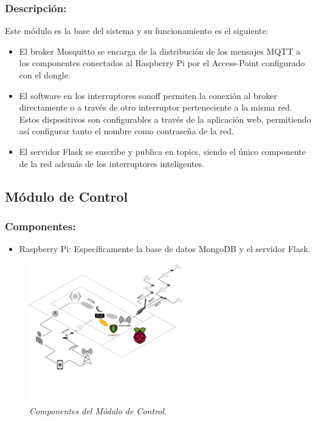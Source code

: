 \subsubsection{Descripción:}

Este módulo es la base del sistema y su funcionamiento es el siguiente:

\begin{itemize}

\item El broker Mosquitto se encarga de la distribución de los mensajes MQTT a los componentes conectados al Raspberry Pi por el Access-Point configurado con el dongle.

\item El software en los interruptores sonoff permiten la conexión al broker directamente o a través de otro interruptor perteneciente a la misma red. Estos dispositivos son configurables a través de la aplicación web, permitiendo así configurar tanto el nombre como contraseña de la red.

\item El servidor Flask se suscribe y publica en topics, siendo el único componente de la red además de los interruptores inteligentes.

\end{itemize}


\subsection{Módulo de Control}

\subsubsection{Componentes:}

\begin{itemize}

\item Raspberry Pi: Específicamente la base de datos MongoDB y el servidor Flask.

\end{itemize}

\begin{figure}[h]
  \centering
  \includegraphics[width=0.6\textwidth, keepaspectratio]{images/mod-ctrl}
  \caption{\textit{Componentes del Módulo de Control.}}
  \label{fig:mod-ctrl-comp}
\end{figure}

